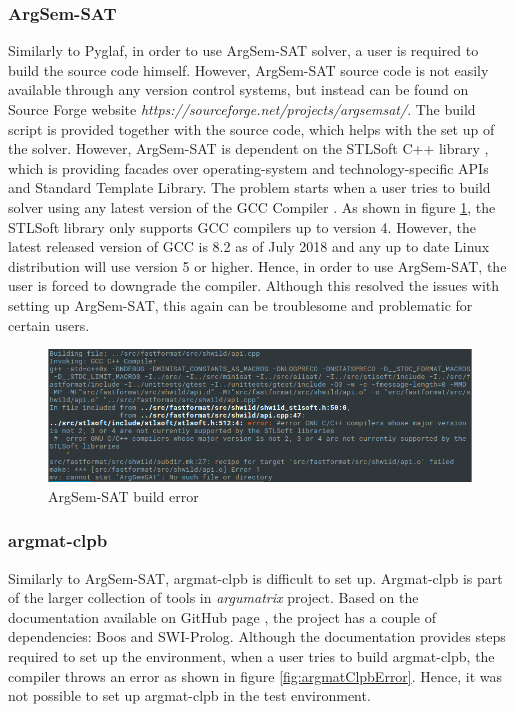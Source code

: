 \subsubsection{ArgSem-SAT}
Similarly to Pyglaf, in order to use ArgSem-SAT solver, a user is required to build the source code himself. However, ArgSem-SAT source code is not easily available through any version control systems, but instead can be found on Source Forge website \textit{https://sourceforge.net/projects/argsemsat/}. The build script is provided together with the source code, which helps with the set up of the solver. However, ArgSem-SAT is dependent on the STLSoft C++ library \citep{stlsoft}, which is providing facades over operating-system and technology-specific APIs and Standard Template Library. The problem starts when a user tries to build solver using any latest version of the GCC Compiler \citep{gcc}. As shown in figure \ref{fig:argsemsatBuildError}, the STLSoft library only supports GCC compilers up to version 4. However, the latest released version of GCC is 8.2 as of July 2018 \citep{gcc} and any up to date Linux distribution will use version 5 or higher. Hence, in order to use ArgSem-SAT, the user is forced to downgrade the compiler. Although this resolved the issues with setting up ArgSem-SAT, this again can be troublesome and problematic for certain users.

\begin{figure}[h]
	\centering
	\includegraphics[width=\linewidth]{"img/argsemsat_error"}
	\caption{ArgSem-SAT build error}
	\label{fig:argsemsatBuildError}
\end{figure}

\subsubsection{argmat-clpb}
Similarly to ArgSem-SAT, argmat-clpb \citep{argmat-clpb} is difficult to set up. Argmat-clpb is part of the larger collection of tools in \textit{argumatrix} project. Based on the documentation available on GitHub page \citep{argmat-clpbGithub}, the project has a couple of dependencies: Boos and SWI-Prolog. Although the documentation provides steps required to set up the environment, when a user tries to build argmat-clpb, the compiler throws an error as shown in figure \ref{fig:argmatClpbError}. Hence, it was not possible to set up argmat-clpb in the test environment.

